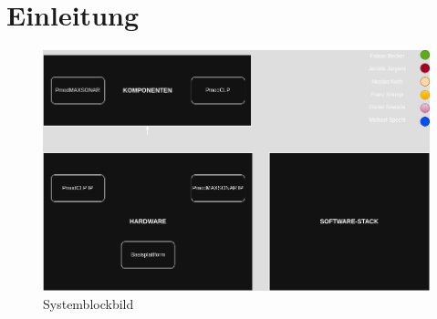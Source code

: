 \chapter{Einleitung}

\begin{figure}[h!]
    \centering
    \begin{minipage}{\textwidth}
        \includegraphics[width=\linewidth]{./images/sketch.drawio.png} %
    \end{minipage}
    \caption{Systemblockbild}
    \label{fig:system}
\end{figure}